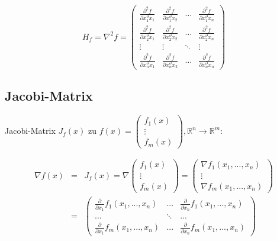 \begin{equation}
	H_f = \nabla^2f = \left( \begin{array}{cccc}
		\frac{\partial^2 f}{\partial x_1^\partial x_1} & \frac{\partial^2 f}{\partial x_1^\partial x_2} 
		& \dots & \frac{\partial^2 f}{\partial x_1^\partial x_n} \\
		
		\frac{\partial^2 f}{\partial x_2^\partial x_1} & \frac{\partial^2 f}{\partial x_2^\partial x_2} 
		& \dots & \frac{\partial^2 f}{\partial x_2^\partial x_n} \\	
		\vdots & \vdots & \ddots & \vdots \\
		\frac{\partial^2 f}{\partial x_n^\partial x_1} & \frac{\partial^2 f}{\partial x_n^\partial x_2} 
		& \dots & \frac{\partial^2 f}{\partial x_n^\partial x_n}
	\end{array}\right)
\end{equation}

\subsection{Jacobi-Matrix} %
\label{sub:jacobi_matrix}
Jacobi-Matrix $J_f(x)$ zu $f(x) = \left( \begin{array}{c}f_1(x)\\\vdots\\f_m(x)\end{array}\right), 
\mathbb{R}^n \rightarrow \mathbb{R}^m$:

\begin{eqnarray}
	\nabla f(x) &=& J_f(x)  = \nabla \left( \begin{array}{c}f_1(x)\\\vdots\\f_m(x)\end{array}\right) 
	= \left( \begin{array}{c} \nabla f_1(x_1,...,x_n) \\ \vdots \\ \nabla f_m(x_1,...,x_n) \end{array} \right) \\
	&=& \left( \begin{array}{ccc} 
			\frac{\partial}{\partial x_1}f_1(x_1,...,x_n) & ... & \frac{\partial}{\partial x_n}f_1(x_1,...,x_n) \\
			... & \ddots & ... \\
			\frac{\partial}{\partial x_1}f_m(x_1,...,x_n) & ... & \frac{\partial}{\partial x_n}f_m(x_1,...,x_n)
		\end{array}\right)
\end{eqnarray}


